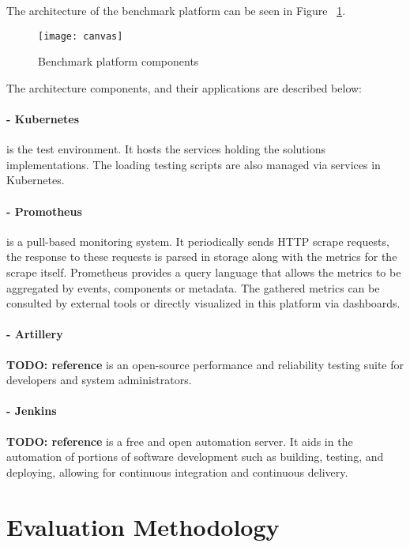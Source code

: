 The architecture of the benchmark platform can be seen in Figure ~\ref{fig:canvas}.

\begin{figure}[htbp]
    \centering
    \texttt{[image: canvas]}
    \caption{Benchmark platform components}
    \label{fig:canvas}
\end{figure}

\newpage

The architecture components, and their applications are described below:

\paragraph{- Kubernetes ~\cite{kubernetes}} is the test environment.
It hosts the services holding the solutions implementations.
The loading testing scripts are also managed via services in Kubernetes.

\paragraph{- Promotheus ~\cite{turnbull2018monitoring}} is a pull-based monitoring system.
It periodically sends HTTP scrape requests, the response to these requests is parsed in storage along with the metrics for the scrape itself.
Prometheus provides a query language that allows the metrics to be aggregated by events, components or metadata.
The gathered metrics can be consulted by external tools or directly visualized in this platform via dashboards.

\paragraph{- Artillery} \textbf{TODO: reference}
is an open-source performance and reliability testing suite for developers and system administrators.

\paragraph{- Jenkins} \textbf{TODO: reference}
is a free and open automation server.
It aids in the automation of portions of software development such as building, testing, and deploying, allowing for continuous integration and continuous delivery.

\section{Evaluation Methodology} %
\label{sec:evaluation_methodology}

